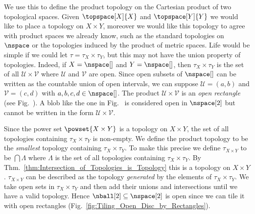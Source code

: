 \documentclass{book}                                                           %
\begin{document}
                We use this to define the product topology on the Cartesian
                product of two topological spaces. Given $\topspace[X]{X}$ and
                $\topspace[Y]{Y}$ we would like to place a topology on
                $X\times{Y}$, moreover we would like this topology to agree with
                product spaces we already know, such as the standard topologies
                on $\nspace$ or the topologies induced by the product of metric
                spaces. Life would be simple if we could let
                $\tau=\tau_{X}\times\tau_{Y}$, but this may not have the union
                property of topologies. Indeed, if $X=\nspace[]$ and
                $Y=\nspace[]$, then $\tau_{X}\times\tau_{Y}$ is the set of all
                $\mathcal{U}\times\mathcal{V}$ where $\mathcal{U}$ and
                $\mathcal{V}$ are open. Since open subsets of $\nspace[]$ can be
                written as the countable union of open intervals, we can suppose
                $\mathcal{U}=(a,b)$ and $\mathcal{V}=(c,d)$ with
                $a,b,c,d\in\nspace[]$. The product
                $\mathcal{U}\times\mathcal{V}$ is an \textit{open rectangle}
                (see Fig.~). A blob like the
                one in Fig.~ is considered
                open in $\nspace[2]$ but cannot be written in the form
                $\mathcal{U}\times\mathcal{V}$.
                \par\hfill\par
                \begin{minipage}[c]{0.52\textwidth}
                    Since the power set $\powset{X\times{Y}}$ is a topology on
                    $X\times{Y}$, the set of all topologies containing
                    $\tau_{X}\times\tau_{Y}$ is non-empty. We define the product
                    topology to be the \textit{smallest} topology containing
                    $\tau_{X}\times\tau_{Y}$. To make this precise we define
                    $\tau_{X\times{Y}}$ to be $\bigcap\Lambda$ where $\Lambda$
                    is the set of all topologies containing
                    $\tau_{X}\times\tau_{Y}$. By
                    Thm.~\ref{thm:Intersection_of_Topologies_is_Topology} this
                    is a topology on $X\times{Y}$.%
                    $\tau_{X\times{Y}}$ can be described as the topology
                    \textit{generated} by the elements of
                    $\tau_{X}\times\tau_{Y}$. We take open sets in
                    $\tau_{X}\times\tau_{Y}$ and then add their unions and
                    intersections until we have a valid topology. Hence
                    $\nball[2]\subseteq\nspace[2]$ is open since we can tile it
                    with open rectangles
                    (Fig.~\ref{fig:Tiling_Open_Disc_by_Rectangles}).
                \end{minipage}
\end{document}
